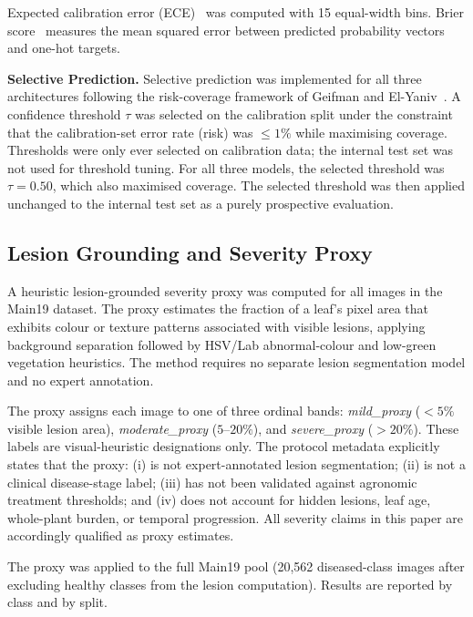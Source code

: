 \documentclass[conference]{IEEEtran}
\begin{document}
Expected calibration error (ECE)~\cite{naeini2015obtaining} was computed with
15 equal-width bins. Brier score~\cite{brier1950verification} measures the
mean squared error between predicted probability vectors and one-hot targets.

\textbf{Selective Prediction.}
Selective prediction was implemented for all three architectures following the
risk-coverage framework of Geifman and El-Yaniv~\cite{geifman2017selective}.
A confidence threshold $\tau$ was selected on the calibration split under the
constraint that the calibration-set error rate (risk) was $\leq 1\%$ while
maximising coverage. Thresholds were only ever selected on calibration data;
the internal test set was not used for threshold tuning. For all three models,
the selected threshold was $\tau = 0.50$, which also maximised coverage.
The selected threshold was then applied unchanged to the internal test set as
a purely prospective evaluation.

\subsection{Lesion Grounding and Severity Proxy}

A heuristic lesion-grounded severity proxy was computed for all images in the
Main19 dataset. The proxy estimates the fraction of a leaf's pixel area that
exhibits colour or texture patterns associated with visible lesions, applying
background separation followed by HSV/Lab abnormal-colour and low-green
vegetation heuristics. The method requires no separate lesion segmentation model
and no expert annotation.

The proxy assigns each image to one of three ordinal bands:
\textit{mild\_proxy} ($<5\%$ visible lesion area),
\textit{moderate\_proxy} ($5$--$20\%$), and
\textit{severe\_proxy} ($>20\%$). These labels are visual-heuristic designations
only. The protocol metadata explicitly states that the proxy: (i) is not
expert-annotated lesion segmentation; (ii) is not a clinical disease-stage label;
(iii) has not been validated against agronomic treatment thresholds; and
(iv) does not account for hidden lesions, leaf age, whole-plant burden, or
temporal progression. All severity claims in this paper are accordingly qualified
as proxy estimates.

The proxy was applied to the full Main19 pool (20,562 diseased-class images after
excluding healthy classes from the lesion computation). Results are reported by
class and by split.
\end{document}
